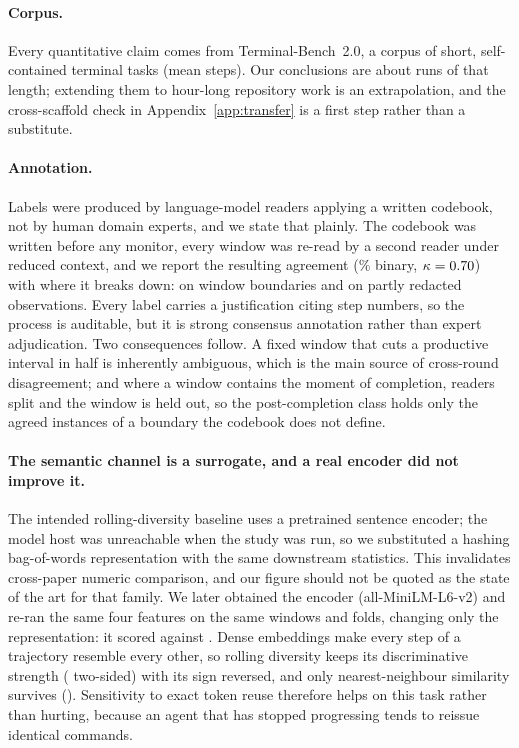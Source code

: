 \paragraph{Corpus.} Every quantitative claim comes from Terminal-Bench~2.0, a corpus of short,
self-contained terminal tasks (mean \pcorpusStepsMean{} steps). Our conclusions are about runs of that
length; extending them to hour-long repository work is an extrapolation, and the cross-scaffold check in
Appendix~\ref{app:transfer} is a first step rather than a substitute.

\paragraph{Annotation.} Labels were produced by language-model readers applying a written codebook, not by
human domain experts, and we state that plainly. The codebook was written before any monitor, every window
was re-read by a second reader under reduced context, and we report the resulting agreement
(\pannBinaryAgr{}\% binary, $\kappa=0.70$) with where it breaks down: on window boundaries and on
partly redacted observations. Every label carries a justification citing step numbers, so the process is
auditable, but it is strong consensus annotation rather than expert adjudication. Two consequences follow.
A fixed window that cuts a productive interval in half is inherently ambiguous, which is the main source of
cross-round disagreement; and where a window contains the moment of completion, readers split and the
window is held out, so the post-completion class holds only the agreed instances of a boundary the
codebook does not define.

\paragraph{The semantic channel is a surrogate, and a real encoder did not improve it.} The intended
rolling-diversity baseline uses a pretrained sentence encoder; the model host was unreachable when the
study was run, so we substituted a hashing bag-of-words representation with the same downstream statistics.
This invalidates cross-paper numeric comparison, and our \sem{} figure should not be quoted as the state of
the art for that family. We later obtained the encoder (all-MiniLM-L6-v2) and re-ran the same four features
on the same windows and folds, changing only the representation: it scored \pprobeRocEnc{} against
\pprobeRocBoW{}. Dense embeddings make every step of a trajectory resemble every other, so rolling diversity
keeps its discriminative strength (\pprobeFeatDiversity{} two-sided) with its sign reversed, and only
nearest-neighbour similarity survives (\pprobeFeatNearest{}). Sensitivity to exact token reuse therefore
helps on this task rather than hurting, because an agent that has stopped progressing tends to reissue
identical commands.

